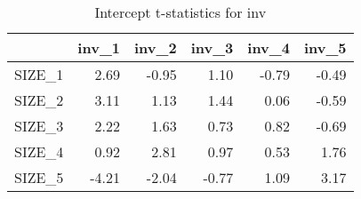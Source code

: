 \begin{table}[ht]
\centering
\caption{Intercept t-statistics for inv} 
\begin{tabular}{rrrrrr}
  \hline
 & inv\_1 & inv\_2 & inv\_3 & inv\_4 & inv\_5 \\ 
  \hline
SIZE\_1 & 2.69 & -0.95 & 1.10 & -0.79 & -0.49 \\ 
  SIZE\_2 & 3.11 & 1.13 & 1.44 & 0.06 & -0.59 \\ 
  SIZE\_3 & 2.22 & 1.63 & 0.73 & 0.82 & -0.69 \\ 
  SIZE\_4 & 0.92 & 2.81 & 0.97 & 0.53 & 1.76 \\ 
  SIZE\_5 & -4.21 & -2.04 & -0.77 & 1.09 & 3.17 \\ 
   \hline
\end{tabular}
\end{table}


